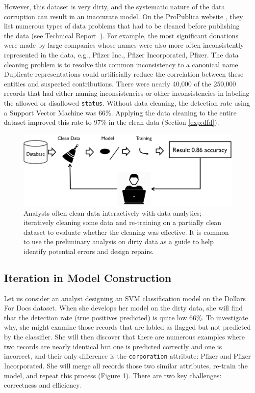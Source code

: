 \vspace{0.5em}

However, this dataset is very dirty, and the systematic nature of the data corruption can result in an inaccurate model.
On the ProPublica website \cite{dollarsfordocs}, they list numerous types of data problems that had to be cleaned before publishing the data (see Technical Report~\cite{activecleanarxiv}).
For example, the most significant donations were made by large companies whose names were also more often inconsistently represented in the data, e.g., Pfizer Inc., Pfizer Incorporated, Pfizer.
The data cleaning problem is to resolve this common inconsistency to a canonical name.
Duplicate representations could artificially reduce the correlation between these entities and suspected contributions.
There were nearly 40,000 of the 250,000 records that had either naming inconsistencies or other inconsistencies in labeling the allowed or disallowed \texttt{status}.
Without data cleaning, the detection rate using a Support Vector Machine was 66\%.
Applying the data cleaning to the entire dataset improved this rate to 97\% in the clean data (Section \ref{exp:dfd}).

\begin{figure}[t]
\centering
 \includegraphics[width=\columnwidth]{figs/workflow.png}
 \caption{Analysts often clean data interactively with data analytics; iteratively cleaning some data and re-training on a partially clean dataset to evaluate whether the cleaning was effective. It is common to use the preliminary analysis on dirty data as a guide to help identify potential errors and design repairs. \label{cartoon}}
\vspace{-2em}
\end{figure}

\subsection{Iteration in Model Construction}
Let us consider an analyst designing an SVM classification model on the Dollars For Docs dataset.
When she develops her model on the dirty data, she will find that the detection rate (true positives predicted) is quite low 66\%.
To investigate why, she might examine those records that are labled as flagged but not predicted by the classifier.
She will then discover that there are numerous examples where two records are nearly identical but one is predicted correctly and one is incorrect, and their only difference is the \texttt{corporation} attribute: Pfizer and Pfizer Incorporated.
She will merge all records those two similar attributes, re-train the model, and repeat this process (Figure \ref{cartoon}).
There are two key challenges: correctness and efficiency.

